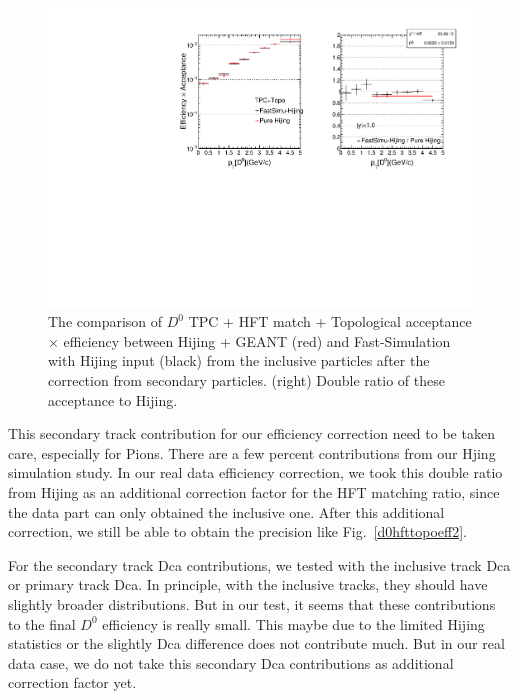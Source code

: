 \begin{figure}[htbp]
\centering
\includegraphics[keepaspectratio,width=1.0\textwidth,angle=0]{figure/Run14_D0HFT/Physics_FastHijingVsPureHijing_HFTTopo_inclusiveCorrect.pdf}
\caption{The comparison of $D^0$ TPC + HFT match + Topological acceptance $\times$ efficiency between Hijing + GEANT (red) and Fast-Simulation with Hijing input (black) from the inclusive particles after the correction from secondary particles. (right) Double ratio of these acceptance to Hijing.}
\label{d0hfttoporealeffinclusivecorrect}
\end{figure}


This secondary track contribution for our efficiency correction need to be taken care, especially for Pions. There are a few percent contributions from our Hjing simulation study. In our real data efficiency correction, we took this double ratio from Hijing as an additional correction factor for the HFT matching ratio, since the data part can only obtained the inclusive one. After this additional correction, we still be able to obtain the precision like Fig.~\ref{d0hfttopoeff2}.

For the secondary track Dca contributions, we tested with the inclusive track Dca or primary track Dca. In principle, with the inclusive tracks, they should have slightly broader distributions. But in our test, it seems that these contributions to the final $D^0$ efficiency is really small. This maybe due to the limited Hijing statistics or the slightly Dca difference does not contribute much. But in our real data case, we do not take this secondary Dca contributions as additional correction factor yet.


